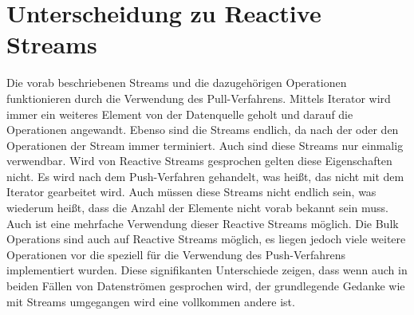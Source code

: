\section{Unterscheidung zu Reactive Streams}
Die vorab beschriebenen Streams und die dazugehörigen Operationen funktionieren durch die Verwendung des Pull-Verfahrens. Mittels Iterator wird immer ein weiteres Element von der Datenquelle geholt und darauf die Operationen angewandt. Ebenso sind die Streams endlich, da nach der oder den Operationen der Stream immer terminiert. Auch sind diese Streams nur einmalig verwendbar. Wird von Reactive Streams gesprochen gelten diese Eigenschaften nicht. Es wird nach dem Push-Verfahren gehandelt, was heißt, das nicht mit dem Iterator gearbeitet wird. Auch müssen diese Streams nicht endlich sein, was wiederum heißt, dass die Anzahl der Elemente nicht vorab bekannt sein muss. Auch ist eine mehrfache Verwendung dieser Reactive Streams möglich. Die Bulk Operations sind auch auf Reactive Streams möglich, es liegen jedoch viele weitere Operationen vor die speziell für die Verwendung des Push-Verfahrens implementiert wurden. Diese signifikanten Unterschiede zeigen, dass wenn auch in beiden Fällen von Datenströmen gesprochen wird, der grundlegende Gedanke wie mit Streams umgegangen wird eine vollkommen andere ist.